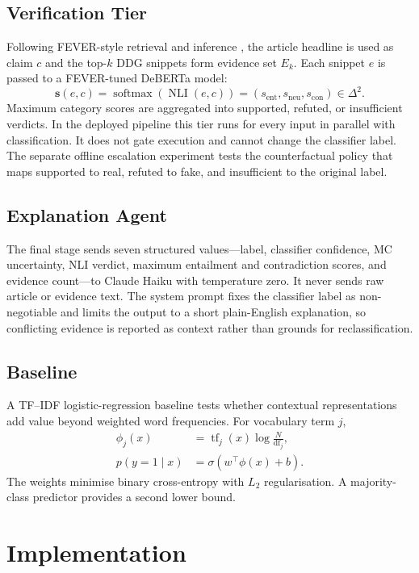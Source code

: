 \documentclass[10pt,twocolumn,letterpaper]{article}
\begin{document}
\subsection{Verification Tier}
Following FEVER-style retrieval and inference \cite{thorne-etal-2018-fever}, the
article headline is used as claim $c$ and the top-$k$ DDG snippets form evidence
set $E_k$. Each snippet $e$ is passed to a FEVER-tuned DeBERTa model:
\begin{equation}
  \mathbf{s}(e,c)=\operatorname{softmax}(\operatorname{NLI}(e,c))
  =(s_{\mathrm{ent}},s_{\mathrm{neu}},s_{\mathrm{con}})\in\Delta^2.
\end{equation}
Maximum category scores are aggregated into supported, refuted, or insufficient
verdicts. In the deployed pipeline this tier runs for every input in parallel with
classification. It does not gate execution and cannot change the classifier label.
The separate offline escalation experiment tests the counterfactual policy that
maps supported to real, refuted to fake, and insufficient to the original label.

\subsection{Explanation Agent}
The final stage sends seven structured values---label, classifier confidence, MC
uncertainty, NLI verdict, maximum entailment and contradiction scores, and evidence
count---to Claude Haiku with temperature zero. It never sends raw article or
evidence text. The system prompt fixes the classifier label as non-negotiable and
limits the output to a short plain-English explanation, so conflicting evidence is
reported as context rather than grounds for reclassification.

\subsection{Baseline}
A TF--IDF logistic-regression baseline tests whether contextual representations
add value beyond weighted word frequencies. For vocabulary term $j$,
\begin{align}
  \phi_j(x) &= \operatorname{tf}_j(x)\log\frac{N}{\operatorname{df}_j}, \\
  p(y=1\mid x) &= \sigma(w^{\top}\phi(x)+b).
\end{align}
The weights minimise binary cross-entropy with $L_2$ regularisation. A
majority-class predictor provides a second lower bound.

\section{Implementation}
\end{document}
